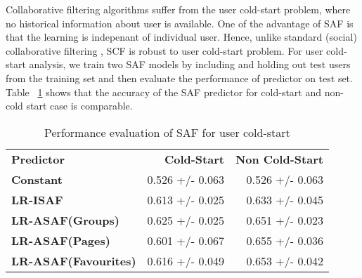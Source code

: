 Collaborative filtering algorithms suffer from the user cold-start problem,
where no historical information about user is available. One of the advantage of SAF is that 
the learning is indepenant of individual user. Hence, unlike standard (social) collaborative
filtering , SCF is robust to user cold-start problem.  For user cold-start analysis, we train
two SAF models by including and holding out test users from the training set and then evaluate
the performance of predictor on test set. Table ~\ref{tab:coldstart} shows that the accuracy 
of the SAF predictor for cold-start and non-cold start case is comparable.  

\begin{table}[t!]
\centering
\begin{tabular}{|>{\small}l|>{\small}r|>{\small}r|}
\hline
& \multicolumn{2}{|c|}{\textbf{Accuracy}}\\
\hline
\textbf{Predictor}& \textbf{Cold-Start} & \textbf{Non Cold-Start}\\
\hline
\textbf{Constant} & 0.526  +/-  0.063 & 0.526  +/-  0.063 \\
\hline
\textbf{LR-ISAF} & 0.613 +/- 0.025 & 0.633  +/-  0.045 \\
\hline
\textbf{LR-ASAF(Groups)} & 0.625  +/-  0.025 & 0.651  +/-  0.023 \\
\hline
\textbf{LR-ASAF(Pages)} & 0.601  +/-  0.067 & 0.655  +/-  0.036 \\
\hline
\textbf{LR-ASAF(Favourites)} & 0.616  +/-  0.049 & 0.653  +/-  0.042\\
\hline
\end{tabular}
\caption{Performance evaluation of SAF for user cold-start}
\label{tab:coldstart}
\end{table}